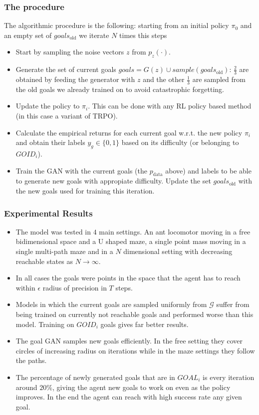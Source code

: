 \documentclass{beamer}
\theoremstyle{plain}
\theoremstyle{definition}
\theoremstyle{remark}
\newcommand{\gold}{goals_{\text{old}}}
\begin{document}
\begin{frame}
	\frametitle{The procedure}
	The algorithmic procedure is the following: starting from an initial policy $\pi_0$ and an empty set of $\gold$ we iterate $N$ times this steps
	\begin{itemize}
		\item Start by sampling the noise vectors $z$ from $p_z(\cdot)$.
		\item Generate the set of current goals $goals=G(z)\cup sample(\gold)$: $\frac{2}{3}$ are obtained by feeding the generator with $z$ and the other $\frac{1}{3}$ are sampled from the old goals we already trained on to avoid catastrophic forgetting.
		\item Update the policy to $\pi_i$. This can be done with any RL policy based method (in this case a variant of TRPO). 
		\item Calculate the empirical returns for each current goal w.r.t. the new policy $\pi_i$ and obtain their labels $y_g\in \{0,1\}$ based on its difficulty (or belonging to $GOID_i$). 
		\item Train the GAN with the current goals (the $p_{\text{data}}$ above) and labels to be able to generate new goals with appropiate difficulty. Update the set $\gold$ with the new goals used for training this iteration.
	\end{itemize}
\end{frame}

\begin{frame}
	\frametitle{Experimental Results}
	\begin{itemize}
		\item The model was tested in $4$ main settings. An ant locomotor moving in a free bidimensional space and a U shaped maze, a single point mass moving in a single multi-path maze and in a $N$ dimensional setting with decreasing reachable states as $N\rightarrow\infty$.
		\item In all cases the goals were points in the space that the agent has to reach within $\epsilon$ radius of precision in $T$ steps.
		\item Models in which the current goals are sampled uniformly from $\mathcal{G}$ suffer from being trained on currently not reachable goals and performed worse than this model. Training on $GOID_i$ goals gives far better results.
		\item The goal GAN samples new goals efficiently. In the free setting they cover circles of increasing radius on iterations while in the maze settings they follow the paths.
		\item The percentage of newly generated goals that are in $GOAL_i$ is every iteration around $20\%$, giving the agent new goals to work on even as the policy improves. In the end the agent can reach with high success rate any given goal.
	\end{itemize}
\end{frame}
\end{document}
